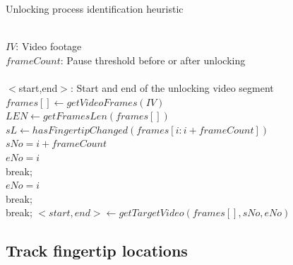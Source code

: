     \begin{algorithm}[!t]
        \centering
        \caption{Unlocking process identification heuristic}
        \label{alg:recognition}
        \begin{algorithmic}[1]
            \REQUIRE~~\\
                $IV$: Video footage  \\
                $frameCount$: Pause threshold before or after unlocking\\
            \ENSURE~~\\
                $<$start,end$>$: Start and end of the unlocking video segment \\
            \STATE $frames[] \leftarrow getVideoFrames(IV)$ \\
            \STATE $LEN \leftarrow getFramesLen(frames[])$ \\
                \STATE $sL \leftarrow hasFingertipChanged(frames[i:i+frameCount])$ \\
                    \STATE $sNo=i+frameCount$ \\
                            \STATE $eNo=i$ \\
                            \STATE break; \\
                            \STATE $eNo=i$ \\
                            \STATE break; \\
                        \ENDIF
                    \ENDFOR
                    \STATE break;
                \ENDIF
            \ENDFOR
            \STATE $<start, end> \leftarrow getTargetVideo(frames[],sNo,eNo)$
        \end{algorithmic}
    \end{algorithm}

\subsection{Track fingertip locations}
\label{section:tld}

